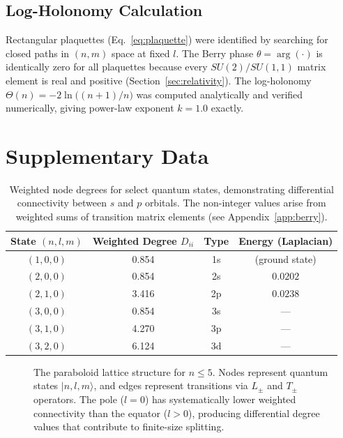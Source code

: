 \documentclass[aps,pra,twocolumn,superscriptaddress,longbibliography]{revtex4-2}
\begin{document}
\subsection{Log-Holonomy Calculation}

Rectangular plaquettes (Eq.~\ref{eq:plaquette}) were identified by searching
for closed paths in $(n,m)$ space at fixed $l$.  The Berry phase
$\theta = \arg(\cdot)$ is identically zero for all plaquettes because every
$SU(2)/SU(1,1)$ matrix element is real and positive
(Section~\ref{sec:relativity}).  The log-holonomy
$\Theta(n) = -2\ln\bigl((n+1)/n\bigr)$ was computed analytically and
verified numerically, giving power-law exponent $k = 1.0$ exactly.


\section{Supplementary Data}

\begin{table}[h]
\centering
\caption{Weighted node degrees for select quantum states, demonstrating differential connectivity between $s$ and $p$ orbitals. The non-integer values arise from weighted sums of transition matrix elements (see Appendix~\ref{app:berry}).}
\begin{tabular}{cccc}
\hline
State $(n,l,m)$ & Weighted Degree $D_{ii}$ & Type & Energy (Laplacian) \\
\hline
$(1,0,0)$ & 0.854 & 1s & (ground state) \\
$(2,0,0)$ & 0.854 & 2s & $0.0202$ \\
$(2,1,0)$ & 3.416 & 2p & $0.0238$ \\
$(3,0,0)$ & 0.854 & 3s & --- \\
$(3,1,0)$ & 4.270 & 3p & --- \\
$(3,2,0)$ & 6.124 & 3d & --- \\
\hline
\end{tabular}
\label{tab:degrees}
\end{table}

\begin{figure}[h]
\centering
{}
\caption{The paraboloid lattice structure for $n \leq 5$. Nodes represent quantum states $|n, l, m\rangle$, and edges represent transitions via $L_{\pm}$ and $T_{\pm}$ operators. The pole ($l=0$) has systematically lower weighted connectivity than the equator ($l > 0$), producing differential degree values that contribute to finite-size splitting.}
\label{fig:lattice}
\end{figure}
\end{document}
